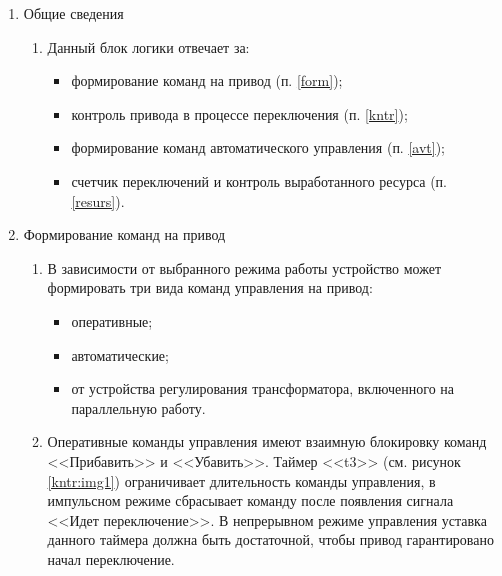 
\color{black}

\begin{enumerate}


\item Общие сведения

\begin{enumerate}

\item Данный блок логики отвечает за:
\begin{itemize}
    \item формирование команд на привод (п. \ref{form});
    \item контроль привода в процессе переключения (п. \ref{kntr});
    \item формирование команд автоматического управления (п. \ref{avt});
    \item счетчик переключений и контроль выработанного ресурса (п. \ref{resurs}).
\end{itemize}


\end{enumerate}

\item\label{form} Формирование команд на привод

\begin{enumerate}

\item В зависимости от выбранного режима работы устройство может формировать три вида команд управления на привод:
\begin{itemize}
    \item оперативные;
    \item автоматические;
    \item от устройства регулирования трансформатора, включенного на параллельную работу.
\end{itemize}

\item\label{vydacha}
Оперативные команды управления имеют взаимную блокировку команд <<Прибавить>> и <<Убавить>>. Таймер <<t3>> (см. рисунок \ref{kntr:img1}) ограничивает длительность команды управления, в импульсном режиме сбрасывает команду после появления сигнала <<Идет переключение>>. В непрерывном режиме управления уставка данного таймера должна быть достаточной, чтобы привод гарантировано начал переключение.


\end{enumerate}
\end{enumerate}
